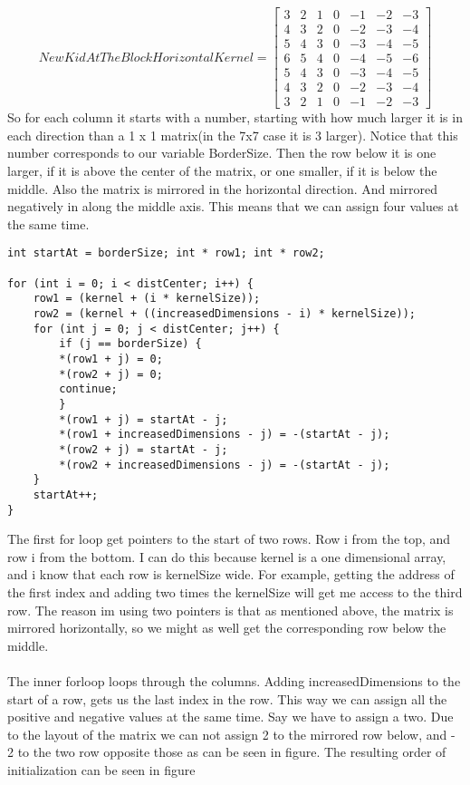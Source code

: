 \documentclass{article}
\begin{document}
\[
NewKidAtTheBlockHorizontalKernel=
\begin{bmatrix}
3 & 2 & 1 & 0 & -1 & -2 & -3\\
4 & 3 & 2 & 0 & -2 & -3 & -4\\
5 & 4 & 3 & 0 & -3 & -4 & -5\\
6 & 5 & 4 & 0 & -4 & -5 & -6\\
5 & 4 & 3 & 0 & -3 & -4 & -5\\
4 & 3 & 2 & 0 & -2 & -3 & -4\\
3 & 2 & 1 & 0 & -1 & -2 & -3
\end{bmatrix}
\]
So for each column it starts with a number, starting with how much larger it is in each direction than a 1 x 1 matrix(in the 7x7 case it is 3 larger). Notice that this number corresponds to our variable BorderSize. Then the row below it is one larger, if it is above the center of the matrix, or one smaller, if it is below the middle. Also the matrix is mirrored in the horizontal direction. And mirrored negatively in along the middle axis. This means that we can assign four values at the same time. 
\begin{lstlisting}
int startAt = borderSize; int * row1; int * row2;

for (int i = 0; i < distCenter; i++) {
	row1 = (kernel + (i * kernelSize));
	row2 = (kernel + ((increasedDimensions - i) * kernelSize));
	for (int j = 0; j < distCenter; j++) {
		if (j == borderSize) {
		*(row1 + j) = 0;
		*(row2 + j) = 0;
		continue;
		}
		*(row1 + j) = startAt - j;	
		*(row1 + increasedDimensions - j) = -(startAt - j);
		*(row2 + j) = startAt - j;
		*(row2 + increasedDimensions - j) = -(startAt - j);
	}
	startAt++;
}
\end{lstlisting}
The first for loop get pointers to the start of two rows. Row i from the top, and row i from the bottom. I can do this because kernel is a one dimensional array, and i know that each row is kernelSize wide. For example, getting the address of the first index and adding two times the kernelSize will get me access to the third row. The reason im using two pointers is that as mentioned above, the matrix is mirrored horizontally, so we might as well get the corresponding row below the middle.\\\\
The inner forloop loops through the columns. Adding increasedDimensions to the start of a row, gets us the last index in the row. This way we can assign all the positive and negative values at the same time. Say we have to assign a two. Due to the layout of the matrix we can not assign 2 to the mirrored row below, and - 2 to the two row opposite those as can be seen in figure. The resulting order of initialization can be seen in figure
\end{document}
